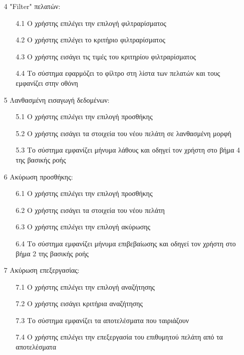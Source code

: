 \documentclass[12pt,a4paper,twoside]{book}
\begin{document}
\begin{enumerate}
  \item[4 ] "Filter" πελατών:
        \begin{enumerate}
          \item [4.1 ] Ο χρήστης επιλέγει την επιλογή φιλτραρίσματος
          \item [4.2 ] Ο χρήστης επιλέγει το κριτήριο φιλτραρίσματος %
          \item [4.3 ] Ο χρήστης εισάγει τις τιμές του κριτηρίου φιλτραρίσματος
          \item [4.4 ] Το σύστημα εφαρμόζει το φίλτρο στη λίστα των πελατών και τους εμφανίζει στην οθόνη
        \end{enumerate}
  \item[5 ] Λανθασμένη εισαγωγή δεδομένων:
        \begin{enumerate}
          \item [5.1 ] Ο χρήστης επιλέγει την επιλογή προσθήκης
          \item [5.2 ] Ο χρήστης εισάγει τα στοιχεία του νέου πελάτη σε λανθασμένη μορφή
          \item [5.3 ] Το σύστημα εμφανίζει μήνυμα λάθους και οδηγεί τον χρήστη στο βήμα 4 της βασικής ροής
        \end{enumerate}
  \item[6 ] Ακύρωση προσθήκης:
        \begin{enumerate}
          \item [6.1 ] Ο χρήστης επιλέγει την επιλογή προσθήκης
          \item [6.2 ] Ο χρήστης εισάγει τα στοιχεία του νέου πελάτη
          \item [6.3 ] Ο χρήστης επιλέγει την επιλογή ακύρωσης
          \item [6.4 ] Το σύστημα εμφανίζει μήνυμα επιβεβαίωσης και οδηγεί τον χρήστη στο βήμα 2 της βασικής ροής
        \end{enumerate}
  \item[7 ] Ακύρωση επεξεργασίας:
        \begin{enumerate}
          \item [7.1 ] Ο χρήστης επιλέγει την επιλογή αναζήτησης
          \item [7.2 ] Ο χρήστης εισάγει κριτήρια αναζήτησης %
          \item [7.3 ] Το σύστημα εμφανίζει τα αποτελέσματα που ταιριάζουν
          \item [7.4 ] Ο χρήστης επιλέγει την επεξεργασία του επιθυμητού πελάτη από τα αποτελέσματα

\end{enumerate}
\end{enumerate}
\end{document}
